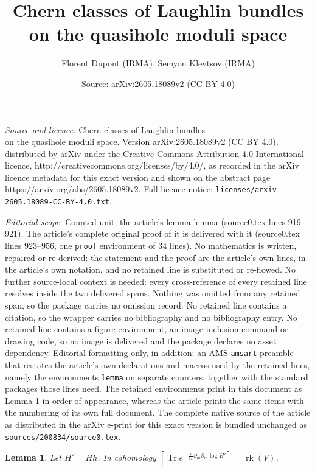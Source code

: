 \documentclass[10pt,a4paper]{amsart}
\title{Chern classes of Laughlin bundles\\ on the quasihole moduli space}
\author{Florent Dupont (IRMA), Semyon Klevtsov (IRMA)}
\date{Source: arXiv:2605.18089v2 (CC BY 4.0)}
\newtheorem{lemma}{Lemma}
\newcommand{\ov}[1]{\overline{#1}}
\DeclareMathOperator{\rk}{rk}
\DeclareMathOperator{\tr}{Tr}
\begin{document}
\maketitle

\noindent\emph{Source and licence.} Chern classes of Laughlin bundles\\ on the quasihole moduli space. Version arXiv:2605.18089v2 (CC BY 4.0), distributed by arXiv under the Creative Commons Attribution 4.0 International licence, http://creativecommons.org/licenses/by/4.0/, as recorded in the arXiv licence metadata for this exact version and shown on the abstract page https://arxiv.org/abs/2605.18089v2. Full licence notice: \texttt{licenses/arxiv-2605.18089-CC-BY-4.0.txt}.\par\smallskip

\noindent\textit{Editorial scope.} Counted unit: the article's lemma lemma (source0.tex lines 919--921). The article's complete original proof of it is delivered with it (source0.tex lines 923--956, one \texttt{proof} environment of 34 lines). No mathematics is written, repaired or re-derived: the statement and the proof are the article's own lines, in the article's own notation, and no retained line is substituted or re-flowed.  No further source-local context is needed: every cross-reference of every retained line resolves inside the two delivered spans.  Nothing was omitted from any retained span, so the package carries no omission record.  No retained line contains a citation, so the wrapper carries no bibliography and no bibliography entry.  No retained line contains a figure environment, an image-inclusion command or drawing code, so no image is delivered and the package declares no asset dependency.  Editorial formatting only, in addition: an AMS \texttt{amsart} preamble that restates the article's own declarations and macros used by the retained lines, namely the environments \texttt{lemma} on separate counters, together with the standard packages those lines need.  The retained environments print in this document as Lemma 1 in order of appearance, whereas the article prints the same items with the numbering of its own full document.  The complete native source of the article as distributed in the arXiv e-print for this exact version is bundled unchanged as \texttt{sources/200834/source0.tex}.
\begin{lemma}
  Let $H'=Hh$. In cohomology $[\tr e^{-\frac{i}{2\pi}\partial_m \ov{\partial}_m \log H'}]=\rk(V)$.
\end{lemma}
\end{document}
